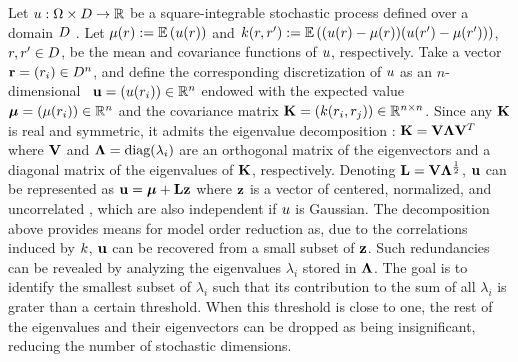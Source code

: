 Let $u: \Omega \times D \to \mathbb{R}$ be a square-integrable stochastic process defined over a domain $D$ \cite{durrett2010}. Let $\fMean{\r} := \E{\u(\r)}$ and $\fCov{\r, \r'} := \E{(\u(\r) - \fMean{\r}) (\u(\r') - \fMean{\r'})}$, $r, r' \in D$, be the mean and covariance functions of $u$, respectively. Take a vector $\mathbf{r} = (r_i) \in D^n$, and define the corresponding discretization of $u$ as an $n$-dimensional \rv\ $\mathbf{u} = (u(r_i)) \in \mathbb{R}^n$ endowed with the expected value $\vmean = (\fMean{\r_i}) \in \real^n$ and the covariance matrix $\mCov = (\fCov{\r_i, \r_j}) \in \real^{n \times n}$. Since any $\mathbf{K}$ is real and symmetric, it admits the eigenvalue decomposition \cite{press2007}: $\mathbf{K} = \mathbf{V} \mathbf{\Lambda} \mathbf{V}^T$ where $\mathbf{V}$ and $\mathbf{\Lambda} = \text{diag}(\lambda_i)$ are an orthogonal matrix of the eigenvectors and a diagonal matrix of the eigenvalues of $\mathbf{K}$, respectively. Denoting $\mathbf{L} = \mathbf{V} \mathbf{\Lambda}^\frac{1}{2}$, $\mathbf{u}$ can be represented as $\mathbf{u} = {\boldsymbol\mu} + \mathbf{L} \mathbf{z}$ where $\mathbf{z}$ is a vector of centered, normalized, and uncorrelated \rvs, which are also independent if $u$ is Gaussian.
The decomposition above provides means for model order reduction as, due to the correlations induced by $\fCov$, $\mathbf{u}$ can be recovered from a small subset of $\mathbf{z}$. Such redundancies can be revealed by analyzing the eigenvalues $\lambda_i$ stored in $\mathbf{\Lambda}$.
The goal is to identify the smallest subset of $\lambda_i$ such that its contribution to the sum of all $\lambda_i$ is grater than a certain threshold.
When this threshold is close to one, the rest of the eigenvalues and their eigenvectors can be dropped as being insignificant, reducing the number of stochastic dimensions.
